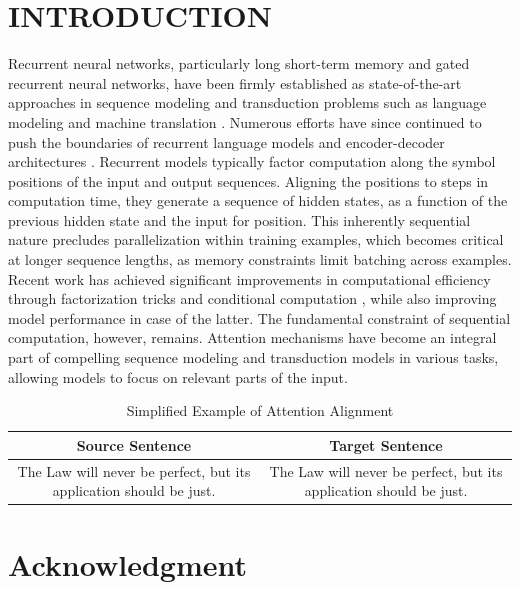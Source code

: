 \documentclass[conference]{IEEEtran}
\begin{document}
\section{INTRODUCTION}
Recurrent neural networks, particularly long short-term memory \cite{ref13} and gated recurrent neural networks, have been firmly established as state-of-the-art approaches in sequence modeling and transduction problems such as language modeling and machine translation \cite{ref35}. Numerous efforts have since continued to push the boundaries of recurrent language models and encoder-decoder architectures \cite{ref38, ref24, ref15}. Recurrent models typically factor computation along the symbol positions of the input and output sequences. Aligning the positions to steps in computation time, they generate a sequence of hidden states, as a function of the previous hidden state and the input for position. This inherently sequential nature precludes parallelization within training examples, which becomes critical at longer sequence lengths, as memory constraints limit batching across examples. Recent work has achieved significant improvements in computational efficiency through factorization tricks \cite{ref21} and conditional computation \cite{ref32}, while also improving model performance in case of the latter. The fundamental constraint of sequential computation, however, remains. Attention mechanisms have become an integral part of compelling sequence modeling and transduction models in various tasks, allowing models to focus on relevant parts of the input.

\begin{table}[htbp]
\caption{Simplified Example of Attention Alignment}
\begin{center}
\begin{tabular}{|c|c|}
\hline
\textbf{Source Sentence} & \textbf{Target Sentence} \\
\hline
The Law will never be perfect, but its application should be just. & The Law will never be perfect, but its application should be just. \\
\hline
\end{tabular}
\end{center}
\end{table}

\section*{Acknowledgment}
\end{document}
